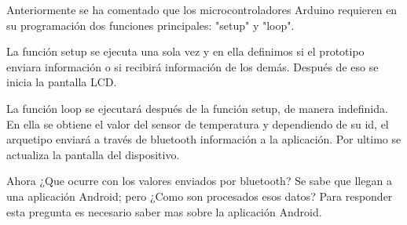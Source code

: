 \par \noindent
Anteriormente se ha comentado que los microcontroladores Arduino requieren en su programación dos funciones principales: "setup" y "loop". 

\par \noindent
La función setup se ejecuta una sola vez y en ella definimos si el prototipo enviara información o si recibirá información de los demás. Después de eso se inicia la pantalla LCD.

\par \noindent
La función loop se ejecutará después de la función setup, de manera indefinida. En ella se obtiene el valor del sensor de temperatura y dependiendo de su id, el arquetipo enviará a través de bluetooth información a la aplicación. Por ultimo se actualiza la pantalla del dispositivo.

\par \noindent
Ahora ¿Que ocurre con los valores enviados por bluetooth? Se sabe que llegan a una aplicación Android; pero ¿Como son procesados esos datos? Para responder esta pregunta es necesario saber mas sobre la aplicación Android.
